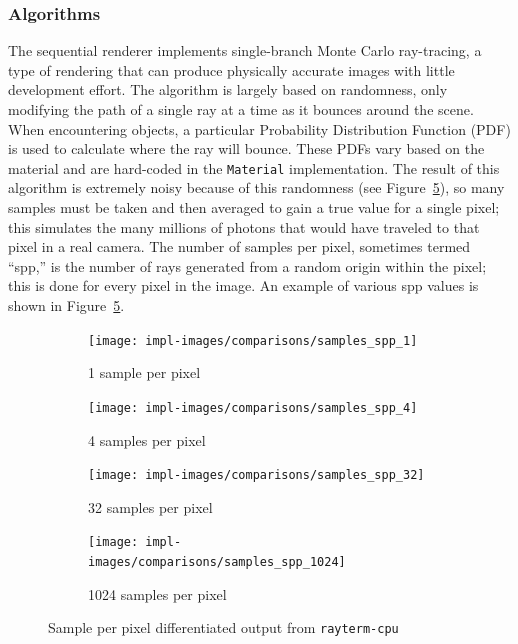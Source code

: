 \subsubsection{Algorithms}
\label{ch:methods:renderer:sequential:algorithms}

The sequential renderer implements single-branch Monte Carlo ray-tracing, a type of rendering that can produce physically accurate images with little development effort.
The algorithm is largely based on randomness, only modifying the path of a single ray at a time as it bounces around the scene.
When encountering objects, a particular Probability Distribution Function (PDF) is used to calculate where the ray will bounce.
These PDFs vary based on the material and are hard-coded in the \texttt{Material} implementation.
The result of this algorithm is extremely noisy because of this randomness (see Figure~\ref{fig:rayterm-cpu_ppm_noisy}), so many samples must be taken and then averaged to gain a true value for a single pixel; this simulates the many millions of photons that would have traveled to that pixel in a real camera.
The number of samples per pixel, sometimes termed ``spp,'' is the number of rays generated from a random origin within the pixel; this is done for every pixel in the image.
An example of various spp values is shown in Figure~\ref{fig:rayterm-cpu_ppm_noisy}.

\vspace{0.3em}
\begin{figure}[htb]
  \centering
  \begin{subfigure}[htb]{0.45\textwidth}
    \texttt{[image: impl-images/comparisons/samples\_spp\_1]}
    \caption{1 sample per pixel}
\label{fig:rayterm-cpu_ppm_noisy_1}
  \end{subfigure}
  \hspace{1em}
  \begin{subfigure}[htb]{0.45\textwidth}
    \texttt{[image: impl-images/comparisons/samples\_spp\_4]}
    \caption{4 samples per pixel}
\label{fig:rayterm-cpu_ppm_noisy_4}
  \end{subfigure}
  \vspace{1em}
  \begin{subfigure}[htb]{0.45\textwidth}
    \texttt{[image: impl-images/comparisons/samples\_spp\_32]}
    \caption{32 samples per pixel}
\label{fig:rayterm-cpu_ppm_noisy_32}
  \end{subfigure}
  \hspace{1em}
  \begin{subfigure}[htb]{0.45\textwidth}
    \texttt{[image: impl-images/comparisons/samples\_spp\_1024]}
    \caption{1024 samples per pixel}
\label{fig:rayterm-cpu_ppm_noisy_1024}
  \end{subfigure}
  \caption{Sample per pixel differentiated output from \texttt{rayterm-cpu}}
\label{fig:rayterm-cpu_ppm_noisy}
\end{figure}

